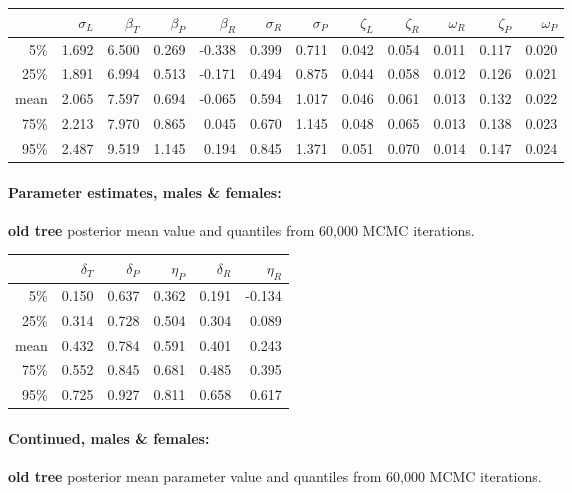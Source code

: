 \documentclass{article}
\begin{document}
\begin{center}
\begin{tabular}{rrrrrrrrrrrr}
  \hline
 & $\sigma_L$ & $\beta_T$ & $\beta_P$ & $\beta_R$ & $\sigma_R$ & $\sigma_P$ & $\zeta_L$ & $\zeta_R$ & $\omega_R$ & $\zeta_P$ & $\omega_P$ \\ 
  \hline
5\% & 1.692 & 6.500 & 0.269 & -0.338 & 0.399 & 0.711 & 0.042 & 0.054 & 0.011 & 0.117 & 0.020 \\ 
  25\% & 1.891 & 6.994 & 0.513 & -0.171 & 0.494 & 0.875 & 0.044 & 0.058 & 0.012 & 0.126 & 0.021 \\ 
  mean & 2.065 & 7.597 & 0.694 & -0.065 & 0.594 & 1.017 & 0.046 & 0.061 & 0.013 & 0.132 & 0.022 \\ 
  75\% & 2.213 & 7.970 & 0.865 & 0.045 & 0.670 & 1.145 & 0.048 & 0.065 & 0.013 & 0.138 & 0.023 \\ 
  95\% & 2.487 & 9.519 & 1.145 & 0.194 & 0.845 & 1.371 & 0.051 & 0.070 & 0.014 & 0.147 & 0.024 \\ 
   \hline
\end{tabular}
\end{center}
\paragraph{Parameter estimates, males \& females:} \textbf{old tree} posterior mean value and quantiles from 60,000 MCMC iterations.


\begin{center}
\begin{tabular}{rrrrrr}
  \hline
 & $\delta_T$ & $\delta_P$ & $\eta_P$ & $\delta_R$ & $\eta_R$ \\ 
  \hline
5\% & 0.150 & 0.637 & 0.362 & 0.191 & -0.134 \\ 
  25\% & 0.314 & 0.728 & 0.504 & 0.304 & 0.089 \\ 
  mean & 0.432 & 0.784 & 0.591 & 0.401 & 0.243 \\ 
  75\% & 0.552 & 0.845 & 0.681 & 0.485 & 0.395 \\ 
  95\% & 0.725 & 0.927 & 0.811 & 0.658 & 0.617 \\ 
   \hline
\end{tabular}
\end{center}
\paragraph{Continued, males \& females:} \textbf{old tree} posterior mean parameter value and quantiles from 60,000 MCMC iterations.
\end{document}
